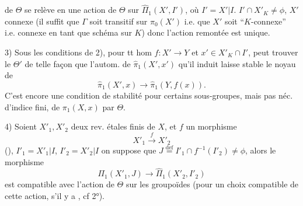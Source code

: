 
de $\Theta$ se relève en une action de $\Theta$ sur $\widehat{\Pi}_1(X',I')$, où $I'=X'\vert I$.
 $I'\cap X'_K\ne\phi$, $X'$  connexe (il suffit que $\Gamma$ soit transitif sur $\pi_0(X')$ i.e. que $X'$ soit ``$K$-connexe'' i.e. connexe en tant que schéma sur $K$) donc l'action remontée est unique.


3) Sous les conditions de 2), pour tt hom $f:X'\longrightarrow Y$ et  $x'\in X'_K\cap I'$,  peut trouver le $\Theta'$  de telle façon que l'autom. de $\widehat{\pi}_1(X',x')$ qu'il induit laisse stable le noyau de
\[
\widehat{\pi}_1(X',x)\longrightarrow\widehat{\pi}_1(Y,f(x)).
\]
C'est encore une condition de stabilité pour certains sous-groupes, mais pas néc. d'indice fini, de $\pi_1(X,x)$ par $\Theta$.


4) Soient $X'_1,X'_2$ deux rev. étales finis de $X$, et $f$ un morphisme
\[
X'_1\xrightarrow{f}X'_2
\]
(), $I'_1=X'_1\vert I$, $I'_2=X'_2\vert I$ on suppose  que $J\overset{\mathrm{def}}=I'_1\cap f^{-1}(I'_2)\ne\phi$,   alors  le morphisme
\[
\Pi_1(X'_1,J)\longrightarrow\widehat{\Pi}_1(X'_2,I'_2)
\]
est compatible avec l'action  de $\Theta$ sur les groupoïdes (pour un choix compatible de cette action, s'il y a , cf 2°).
